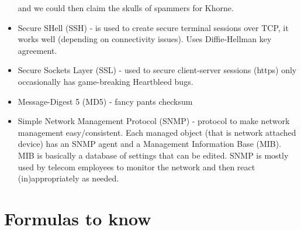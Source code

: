\documentclass{scrartcl}
\begin{document}
\begin{itemize}
and we could then claim the skulls of spammers for Khorne.
\item Secure SHell (SSH) - is used to create secure terminal sessions over TCP,
it works well (depending on connectivity issues). Uses Diffie-Hellman key
agreement.
\item Secure Sockets Layer (SSL) - used to secure client-server sessions (https)
only occasionally has game-breaking Heartbleed bugs.
\item Message-Digest 5 (MD5) - fancy pants checksum
\item Simple Network Management Protocol (SNMP) - protocol to make
network management easy/consistent. Each managed object (that is network
attached device) has an SNMP agent and a Management Information Base (MIB).
MIB is basically a database of settings that can be edited. SNMP is mostly used
by telecom employees to monitor the network and then react (in)appropriately
as needed.
\end{itemize}
\section*{Formulas to know}
\end{document}
